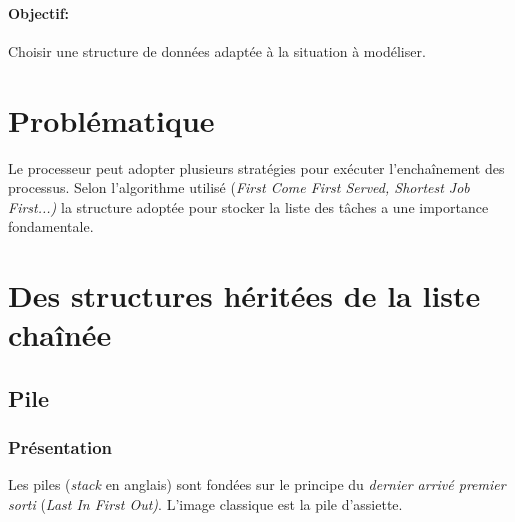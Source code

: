\documentclass[a4paper,11pt]{article}
\begin{document}
\begin{Form}
\paragraph{Objectif:}Choisir une structure de données adaptée à la situation à modéliser.
\section{Problématique}
Le processeur peut adopter plusieurs stratégies pour exécuter l'enchaînement des processus. Selon l'algorithme utilisé (\emph{First Come First Served, Shortest Job First...)} la structure adoptée pour stocker la liste des tâches a une importance fondamentale.
\begin{center}
\end{center}
\section{Des structures héritées de la liste chaînée}
\subsection{Pile}
\subsubsection{Présentation}
Les piles (\emph{stack} en anglais) sont fondées sur le principe du \emph{dernier arrivé premier sorti} (\emph{Last In First Out)}. L'image classique est la pile d'assiette.
\begin{figure}[!h]
\centering
{}
\end{figure}

\end{Form}
\end{document}
